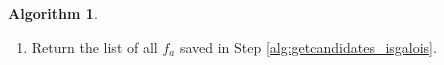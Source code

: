 \documentclass{dcthesis}
\newcommand{\ZZ}{\mathbb Z}
\newcommand{\mm}[1]{{\color{blue} \sf MM: [#1]}}
\newcommand{\wt}[1]{\widetilde{#1}}
\newcommand{\LL}{\mathscr L}
\newcommand{\FF}{\mathbb{F}}
\DeclareMathOperator{\Div}{Div}
\DeclareMathOperator{\Pic}{Pic}
\numberwithin{equation}{section}
\theoremstyle{definition}
\newtheorem{alg}[equation]{Algorithm}
\theoremstyle{remark}
\begin{document}
{{\begin{alg}
\begin{enumerate}
\begin{enumerate}
              and $f_a$
              from Step
              \ref{alg:getcandidates_dimLDa}
              to see if $F(\sqrt{f_a})$
              generates a Galois extension.
              If $F(\sqrt{f_a})$ is Galois over
              $\FF_q(x)$ then save $f_a$.
              Go to the next
              $a\in\Pic(F)[2]$.
          \end{enumerate}
        \item\label{alg:getcandidates_return}
          Return the list of all $f_a$
          saved in Step \ref{alg:getcandidates_isgalois}.
      \end{enumerate}

\end{alg}}}
\end{document}
